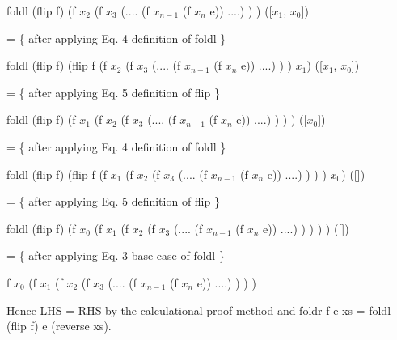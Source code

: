 \documentclass[12pt]{article}
\begin{document}
	 foldl (flip f) (f $x_{2}$ (f $x_{3}$ (.... (f $x_{n-1}$ (f $x_{n}$ e)) ....) ) ) ([$x_{1}$, $x_{0}$])

	 = \{ after applying Eq. 4 definition of foldl \}
	 
	 foldl (flip f) (flip f (f $x_{2}$ (f $x_{3}$ (.... (f $x_{n-1}$ (f $x_{n}$ e)) ....) ) ) $x_{1}$) ([$x_{1}$, $x_{0}$])

	 = \{ after applying Eq. 5 definition of flip \}
	 
	 foldl (flip f) (f $x_{1}$ (f $x_{2}$ (f $x_{3}$ (.... (f $x_{n-1}$ (f $x_{n}$ e)) ....) ) ) ) ([$x_{0}$])

	 = \{ after applying Eq. 4 definition of foldl \}
	 
	 foldl (flip f) (flip f (f $x_{1}$ (f $x_{2}$ (f $x_{3}$ (.... (f $x_{n-1}$ (f $x_{n}$ e)) ....) ) ) ) $x_{0}$) ([])

	 = \{ after applying Eq. 5 definition of flip \}
	 
	 foldl (flip f) (f $x_{0}$ (f $x_{1}$ (f $x_{2}$ (f $x_{3}$ (.... (f $x_{n-1}$ (f $x_{n}$ e)) ....) ) ) ) ) ([])

	 = \{ after applying Eq. 3 base case of foldl \}
	 
	 f $x_{0}$ (f $x_{1}$ (f $x_{2}$ (f $x_{3}$ (.... (f $x_{n-1}$ (f $x_{n}$ e)) ....) ) ) )
	 
	 
	
	
	Hence LHS = RHS by the calculational proof method and foldr f e xs = foldl (flip f) e (reverse xs).

	
\end{document}
